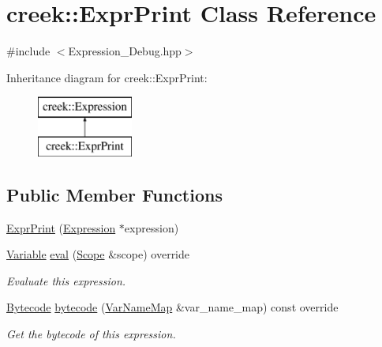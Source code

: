 \hypertarget{classcreek_1_1_expr_print}{}\section{creek\+:\+:Expr\+Print Class Reference}
\label{classcreek_1_1_expr_print}


{\ttfamily \#include $<$Expression\+\_\+\+Debug.\+hpp$>$}

Inheritance diagram for creek\+:\+:Expr\+Print\+:\begin{figure}[H]
\begin{center}
\leavevmode
\includegraphics[height=2.000000cm]{classcreek_1_1_expr_print}
\end{center}
\end{figure}
\subsection*{Public Member Functions}
\begin{DoxyCompactItemize}
\item 
\hyperlink{classcreek_1_1_expr_print_a3c6df5af6863b099c0b2b1d15a811d72}{Expr\+Print} (\hyperlink{classcreek_1_1_expression}{Expression} $\ast$expression)
\item 
\hyperlink{classcreek_1_1_variable}{Variable} \hyperlink{classcreek_1_1_expr_print_abcbd3bcb766342402937c5c5e38efcff}{eval} (\hyperlink{classcreek_1_1_scope}{Scope} \&scope) override
\begin{DoxyCompactList}\small\item\em Evaluate this expression. \end{DoxyCompactList}\item 
\hyperlink{classcreek_1_1_bytecode}{Bytecode} \hyperlink{classcreek_1_1_expr_print_a4a958460aa68688aa7b150703a478b94}{bytecode} (\hyperlink{classcreek_1_1_var_name_map}{Var\+Name\+Map} \&var\+\_\+name\+\_\+map) const  override\hypertarget{classcreek_1_1_expr_print_a4a958460aa68688aa7b150703a478b94}{}\label{classcreek_1_1_expr_print_a4a958460aa68688aa7b150703a478b94}

\begin{DoxyCompactList}\small\item\em Get the bytecode of this expression. \end{DoxyCompactList}\end{DoxyCompactItemize}


